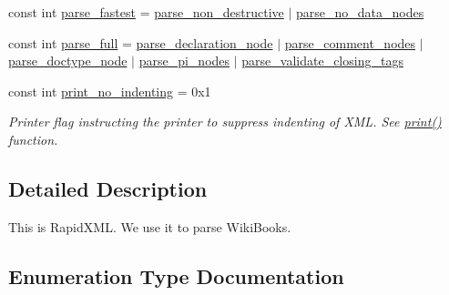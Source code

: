 \begin{DoxyCompactItemize}
\item 
const int \hyperlink{namespacerapidxml_a64da06dfdab7c86ca954bda4fecb978f}{parse\+\_\+fastest} = \hyperlink{namespacerapidxml_a45d4d8fef551beaaba23a83b847fd6a3}{parse\+\_\+non\+\_\+destructive} $\vert$ \hyperlink{namespacerapidxml_ac2d21ef14a4e8936b94aca5d38b1a74d}{parse\+\_\+no\+\_\+data\+\_\+nodes}
\item 
const int \hyperlink{namespacerapidxml_abb48dc65db75d9e49734bc5bd2fabbfc}{parse\+\_\+full} = \hyperlink{namespacerapidxml_a999d782659513f8015ea4236e3204c42}{parse\+\_\+declaration\+\_\+node} $\vert$ \hyperlink{namespacerapidxml_ae093dd49e2f59fa39eee95f1a6568e32}{parse\+\_\+comment\+\_\+nodes} $\vert$ \hyperlink{namespacerapidxml_a41002b49780a90a0bbcc28ce8b895fe4}{parse\+\_\+doctype\+\_\+node} $\vert$ \hyperlink{namespacerapidxml_a03fe68fcf5d28f38476e0fd31adecc4c}{parse\+\_\+pi\+\_\+nodes} $\vert$ \hyperlink{namespacerapidxml_a7ce8f40fda68338e20b56f41e48e49f3}{parse\+\_\+validate\+\_\+closing\+\_\+tags}
\item 
const int \hyperlink{namespacerapidxml_a65477b812a80f5bda693ec57e57de064}{print\+\_\+no\+\_\+indenting} = 0x1
\begin{DoxyCompactList}\small\item\em Printer flag instructing the printer to suppress indenting of X\+M\+L. See \hyperlink{namespacerapidxml_a0fb0be6eba49fb2e2646d5a72a0dc355}{print()} function. \end{DoxyCompactList}\end{DoxyCompactItemize}


\subsection{Detailed Description}
This is Rapid\+X\+M\+L. We use it to parse Wiki\+Books. 

\subsection{Enumeration Type Documentation}
\hypertarget{namespacerapidxml_abb456db38f7efb746c4330eed6072a7c}{}
